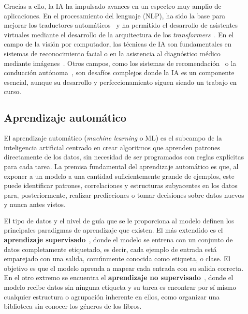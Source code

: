 Gracias a ello, la IA ha impulsado avances en un espectro muy amplio de aplicaciones. En el procesamiento del lenguaje (NLP), ha sido la base para mejorar los traductores automáticos~\cite{wu2016google} y ha permitido el desarrollo de asistentes virtuales mediante el desarrollo de la arquitectura de los \textit{transformers}~\cite{vaswani2017attention}. En el campo de la visión por computador, las técnicas de IA son fundamentales en sistemas de reconocimiento facial o en la asistencia al diagnóstico médico mediante imágenes~\cite{razzak2017deep}. Otros campos, como los sistemas de recomendación~\cite{gheewala2025depth} o la conducción autónoma~\cite{grigorescu2020survey}, son desafíos complejos donde la IA es un componente esencial, aunque su desarrollo y perfeccionamiento siguen siendo un trabajo en curso.

\subsection{Aprendizaje automático}

El aprendizaje automático (\textit{machine learning} o ML) es el subcampo de la inteligencia artificial centrado en crear algoritmos que aprenden patrones directamente de los datos, sin necesidad de ser programados con reglas explícitas para cada tarea. La premisa fundamental del aprendizaje automático es que, al exponer a un modelo a una cantidad suficientemente grande de ejemplos, este puede identificar patrones, correlaciones y estructuras subyacentes en los datos para, posteriormente, realizar predicciones o tomar decisiones sobre datos nuevos y nunca antes vistos.

El tipo de datos y el nivel de guía que se le proporciona al modelo definen los principales paradigmas de aprendizaje que existen. El más extendido es el \textbf{aprendizaje supervisado}~\cite{cortes1995support}, donde el modelo se entrena con un conjunto de datos completamente etiquetado, es decir, cada ejemplo de entrada está emparejado con una salida, comúnmente conocida como etiqueta, o clase. El objetivo es que el modelo aprenda a mapear cada entrada con su salida correcta. En el otro extremo se encuentra el \textbf{aprendizaje no supervisado}~\cite{hinton2006reducing}, donde el modelo recibe datos sin ninguna etiqueta y su tarea es encontrar por sí mismo cualquier estructura o agrupación inherente en ellos, como organizar una biblioteca sin conocer los géneros de los libros.

